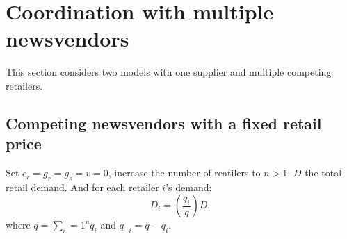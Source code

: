 \section{Coordination with multiple newsvendors}
This section considers two models with one supplier and multiple competing retailers. 

\subsection{Competing newsvendors with a fixed retail price}
Set $c_r=g_r=g_s=v=0$, increase the number of reatilers to $n>1$. $D$ the total retail demand. And for each retailer $i$'s demand:
\begin{equation*}
    D_i=\left(\frac{q_i}{q}\right)D,
\end{equation*}
where $q=\sum_i=1^n q_i$ and $q_{-i}=q-q_i$. 







